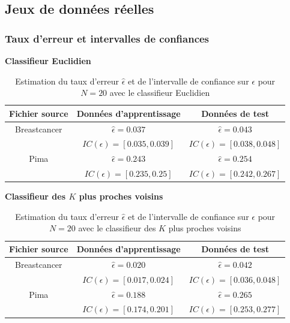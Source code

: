 \documentclass[a4paper,10pt]{report}
\begin{document}
\subsection{Jeux de données réelles}




\subsubsection{Taux d'erreur et intervalles de confiances}

\textbf{Classifieur Euclidien}

\begin{table}[H]
	\centering
	\captionsetup{justification=centering, margin=4cm}
	\begin{tabular}{c|c|c}
		Fichier source & Données d'apprentissage & Données de test \\ 
		\hline
		\small Breastcancer & $ \hat{\epsilon} = 0.037 $  &  $ \hat{\epsilon} = 0.043 $ \\
		&  $ IC(\epsilon) = [ 0.035 , 0.039 ] $  & $ IC(\epsilon) = [ 0.038 , 0.048 ] $ \\ 
		\hline
		\small Pima & $ \hat{\epsilon} = 0.243 $  &  $ \hat{\epsilon} = 0.254 $ \\
		&  $ IC(\epsilon) = [ 0.235 , 0.25 ] $  & $ IC(\epsilon) = [ 0.242 , 0.267 ] $ \\ 
	\end{tabular}
	\caption{\small Estimation du taux d'erreur $\hat{\epsilon}$ et de l'intervalle de confiance sur $\epsilon$ pour $N = 20$ avec le classifieur Euclidien}
	\label{table:1-2-3-error-rate-ceuc}
\end{table}


\textbf{Classifieur des $K$ plus proches voisins}

\begin{table}[H]
	\centering
	\captionsetup{justification=centering, margin=4cm}
	\begin{tabular}{c|c|c}
		Fichier source & Données d'apprentissage & Données de test \\ 
		\hline
		\small Breastcancer & $ \hat{\epsilon} = 0.020 $  &  $ \hat{\epsilon} = 0.042 $ \\
		&  $ IC(\epsilon) = [ 0.017 , 0.024 ] $  & $ IC(\epsilon) = [ 0.036 , 0.048 ] $ \\ 
		\hline
		\small Pima & $ \hat{\epsilon} = 0.188 $  &  $ \hat{\epsilon} = 0.265 $ \\
		&  $ IC(\epsilon) = [ 0.174 , 0.201 ] $  & $ IC(\epsilon) = [ 0.253 , 0.277 ] $ \\ 
	\end{tabular}
	\caption{\small Estimation du taux d'erreur $\hat{\epsilon}$ et de l'intervalle de confiance sur $\epsilon$ pour $N = 20$ avec le classifieur des $K$ plus proches voisins}
	\label{table:1-2-3-error-rate-kppv}
\end{table}
\end{document}

